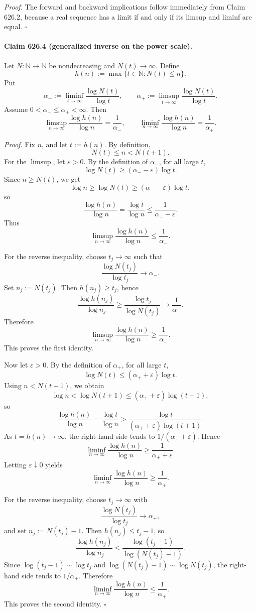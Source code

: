 \emph{Proof.}
The forward and backward implications follow immediately from Claim 626.2, because a real sequence has a limit if and only if its limsup and liminf are equal. \(\square\)

\paragraph{Claim 626.4 (generalized inverse on the power scale).}
Let \(N:\mathbb{N}\to\mathbb{N}\) be nondecreasing and \(N(t)\to\infty\).
Define
\[
h(n):=\max\{t\in\mathbb{N}:N(t)\le n\}.
\]
Put
\[
\alpha_-:=\liminf_{t\to\infty}\frac{\log N(t)}{\log t},
\qquad
\alpha_+:=\limsup_{t\to\infty}\frac{\log N(t)}{\log t}.
\]
Assume \(0<\alpha_-\le \alpha_+<\infty\).
Then
\[
\limsup_{n\to\infty}\frac{\log h(n)}{\log n}=\frac{1}{\alpha_-},
\qquad
\liminf_{n\to\infty}\frac{\log h(n)}{\log n}=\frac{1}{\alpha_+}.
\]

\emph{Proof.}
Fix \(n\), and let \(t:=h(n)\). By definition,
\[
N(t)\le n < N(t+1).
\]
For the \(\limsup\), let \(\varepsilon>0\). By the definition of \(\alpha_-\), for all large \(t\),
\[
\log N(t)\ge (\alpha_--\varepsilon)\log t.
\]
Since \(n\ge N(t)\), we get
\[
\log n\ge \log N(t)\ge (\alpha_--\varepsilon)\log t,
\]
so
\[
\frac{\log h(n)}{\log n}=\frac{\log t}{\log n}\le \frac{1}{\alpha_--\varepsilon}.
\]
Thus
\[
\limsup_{n\to\infty}\frac{\log h(n)}{\log n}\le \frac{1}{\alpha_-}.
\]

For the reverse inequality, choose \(t_j\to\infty\) such that
\[
\frac{\log N(t_j)}{\log t_j}\to \alpha_-.
\]
Set \(n_j:=N(t_j)\). Then \(h(n_j)\ge t_j\), hence
\[
\frac{\log h(n_j)}{\log n_j}\ge \frac{\log t_j}{\log N(t_j)}\to \frac{1}{\alpha_-}.
\]
Therefore
\[
\limsup_{n\to\infty}\frac{\log h(n)}{\log n}\ge \frac{1}{\alpha_-}.
\]
This proves the first identity.

Now let \(\varepsilon>0\). By the definition of \(\alpha_+\), for all large \(t\),
\[
\log N(t)\le (\alpha_++\varepsilon)\log t.
\]
Using \(n<N(t+1)\), we obtain
\[
\log n<\log N(t+1)\le (\alpha_++\varepsilon)\log(t+1),
\]
so
\[
\frac{\log h(n)}{\log n}=\frac{\log t}{\log n}>
\frac{\log t}{(\alpha_++\varepsilon)\log(t+1)}.
\]
As \(t=h(n)\to\infty\), the right-hand side tends to \(1/(\alpha_++\varepsilon)\). Hence
\[
\liminf_{n\to\infty}\frac{\log h(n)}{\log n}\ge \frac{1}{\alpha_++\varepsilon}.
\]
Letting \(\varepsilon\downarrow 0\) yields
\[
\liminf_{n\to\infty}\frac{\log h(n)}{\log n}\ge \frac{1}{\alpha_+}.
\]

For the reverse inequality, choose \(t_j\to\infty\) with
\[
\frac{\log N(t_j)}{\log t_j}\to \alpha_+,
\]
and set \(n_j:=N(t_j)-1\). Then \(h(n_j)\le t_j-1\), so
\[
\frac{\log h(n_j)}{\log n_j}
\le
\frac{\log(t_j-1)}{\log(N(t_j)-1)}.
\]
Since \(\log(t_j-1)\sim \log t_j\) and \(\log(N(t_j)-1)\sim \log N(t_j)\), the right-hand side tends to \(1/\alpha_+\). Therefore
\[
\liminf_{n\to\infty}\frac{\log h(n)}{\log n}\le \frac{1}{\alpha_+}.
\]
This proves the second identity. \(\square\)

